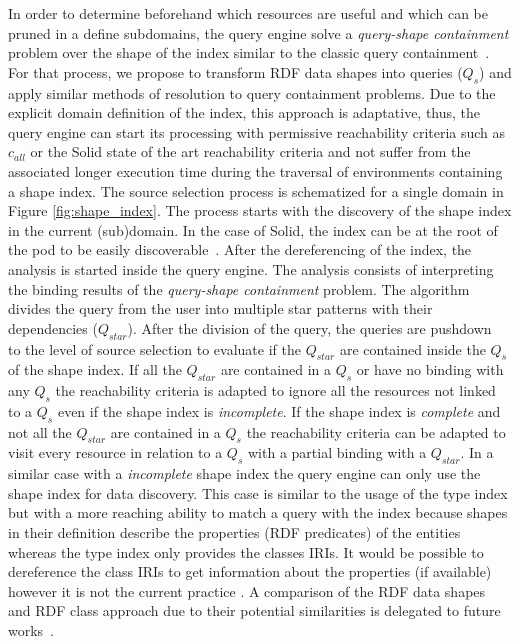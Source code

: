 In order to determine beforehand which resources are useful and which can be pruned in a define subdomains, the query engine solve a \emph{query-shape containment} problem over the shape of the index similar to the classic query containment~\cite{afariQCE, Spasi2023}.
For that process, we propose to transform RDF data shapes into queries ($Q_{s}$) \cite{labragayo2017validating, Corman2019, Delva2021} and apply similar methods of resolution to query containment problems.
Due to the explicit domain definition of the index, this approach is adaptative, 
thus, the query engine can start its processing with permissive reachability criteria
such as $c_{all}$ \cite{Hartig2012} or the Solid state of the art reachability criteria \cite{Taelman2023}
and not suffer from the associated longer execution time during the traversal of environments containing a shape index.
The source selection process is schematized for a single domain in Figure \ref{fig:shape_index}.
The process starts with the discovery of the shape index in the current (sub)domain.
In the case of Solid, the index can be at the root of the pod to be easily discoverable~.
After the dereferencing of the index, the analysis is started inside the query engine.
The analysis consists of interpreting the binding results of the \emph{query-shape containment} problem.
The algorithm divides the query from the user into multiple star patterns with their dependencies ($Q_{star}$).
After the division of the query, the queries are pushdown~\cite{Yang2021FlexPushdownDBHP} to the level of source selection to evaluate if the $Q_{star}$ are contained inside the $Q_s$ of the shape index.
If all the $Q_{star}$ are contained in a $Q_{s}$ or have no binding with any $Q_{s}$
the reachability criteria is adapted to ignore all the resources not linked to a $Q_{s}$ even if the shape index is \emph{incomplete}.
If the shape index is \emph{complete} and not all the $Q_{star}$ are contained in a $Q_{s}$ the reachability criteria can be adapted
to visit every resource in relation to a $Q_{s}$ with a partial binding with a $Q_{star}$.
In a similar case with a \emph{incomplete} shape index the query engine can only use the shape index for data discovery.
This case is similar to the usage of the type index but with a more reaching ability to match a query with the index  because shapes in their definition describe the properties (RDF predicates) of the entities whereas the type index only provides the classes IRIs.
It would be possible to dereference the class IRIs to get information about the properties (if available) however it is not the current practice \cite{Taelman2023}.
A comparison of the RDF data shapes and RDF class approach due to their potential similarities is delegated to future works~.

